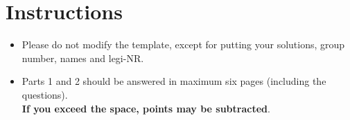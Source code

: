 \documentclass[11pt]{article}
\begin{document}


\section*{Instructions}

\begin{itemize}
    \item Please do not modify the template, except for putting your solutions, group number, names and legi-NR.
    \item Parts 1 and 2 should be answered in maximum six pages (including the questions).\\\textbf{If you exceed the space, points may be subtracted}.
    
\end{itemize}

\newpage



\end{document}

